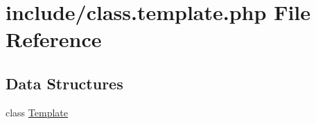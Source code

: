 \hypertarget{class_8template_8php}{\section{include/class.template.\-php File Reference}
\label{class_8template_8php}
}
\subsection*{Data Structures}
\begin{DoxyCompactItemize}
\item 
class \hyperlink{class_template}{Template}
\end{DoxyCompactItemize}
